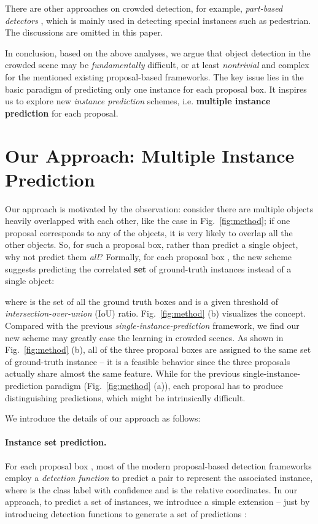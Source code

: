 \documentclass[10pt,twocolumn,letterpaper]{article}
\begin{document}
There are other approaches on crowded detection, for example, \emph{part-based detectors} \cite{occludedattention,tian2015deep,Zhou_2018_ECCV,chi2019pedhunter}, which is mainly used in detecting special instances such as pedestrian. The discussions are omitted in this paper. 

In conclusion, based on the above analyses, we argue that object detection in the crowded scene may be \emph{fundamentally} difficult, or at least \emph{nontrivial} and complex for the mentioned existing proposal-based frameworks. The key issue lies in the basic paradigm of predicting only one instance for each proposal box. It inspires us to explore new \emph{instance prediction} schemes, i.e. \textbf{multiple instance prediction} for each proposal. 

\section{Our Approach: Multiple Instance Prediction}
\label{sec:ourapproach}
Our approach is motivated by the observation: consider there are multiple objects heavily overlapped with each other, like the case in Fig.~\ref{fig:method}; if one proposal corresponds to any of the objects, it is very likely to overlap all the other objects. So, for such a proposal box, rather than predict a single object, why not predict them \emph{all}? Formally, for each proposal box , the new scheme suggests predicting the correlated \textbf{set} of ground-truth instances  instead of a single object:

where  is the set of all the ground truth boxes and  is a given threshold of \emph{intersection-over-union} (IoU) ratio. Fig.~\ref{fig:method} (b) visualizes the concept. Compared with the previous \emph{single-instance-prediction} framework, we find our new scheme may greatly ease the learning in crowded scenes. As shown in Fig.~\ref{fig:method} (b), all of the three proposal boxes are assigned to the same set of ground-truth instance -- it is a feasible behavior since the three proposals actually share almost the same feature. While for the previous single-instance-prediction paradigm (Fig.~\ref{fig:method} (a)), each proposal has to produce distinguishing predictions, which might be intrinsically difficult.  
 
We introduce the details of our approach as follows:

\paragraph{Instance set prediction. }
For each proposal box , most of the modern proposal-based detection frameworks \cite{ren2015faster,lin2017feature,lin2017focal,liu2016ssd,he2017mask} employ a \emph{detection function} to predict a pair  to represent the associated instance, where  is the class label with confidence and  is the relative coordinates. In our approach, to predict a set of instances, we introduce a simple extension -- just by introducing  detection functions to generate a set of predictions :
\end{document}
